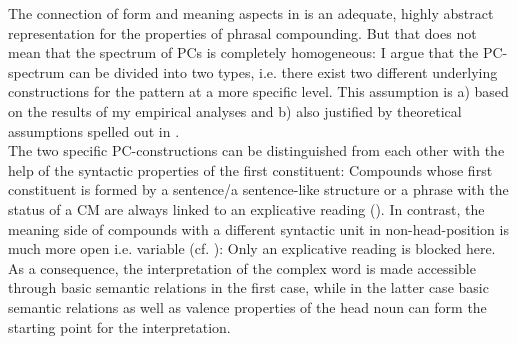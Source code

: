 \documentclass[output=paper]{LSP/langsci}
\begin{document}
The connection of form and meaning aspects in  is an adequate, highly abstract representation for the properties of phrasal compounding. But that does not mean that the spectrum of PCs is completely homogeneous: I argue that the PC-spectrum can be divided into two types, i.e. there exist two different underlying constructions for the pattern at a more specific level. This assumption is a) based on the results of my empirical analyses and b) also justified by theoretical assumptions spelled out in \citet[Chapter II.2.2]{Hein2015}.\\
The two specific PC-constructions can be distinguished from each other with the help of the syntactic properties of the first constituent:  Compounds whose first constituent is  formed by a sentence\slash a sentence-like structure or a phrase with the status of a CM are always linked to an explicative reading (). In contrast, the meaning side of compounds with a different syntactic unit in non-head-position is much more open i.e. variable (cf. ): Only an explicative reading is blocked here. As a consequence, the interpretation of the complex word is made accessible through basic semantic relations in the first case, while in the latter case basic semantic relations as well as valence  properties of the head noun can form the starting point for the interpretation. 
\end{document}
